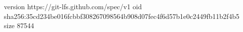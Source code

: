 version https://git-lfs.github.com/spec/v1
oid sha256:35cd234be016fcbbf308267098564b908d07fec4f6d57b1e0c2449fb11b2f4b5
size 87544
